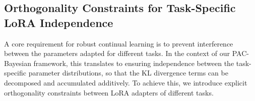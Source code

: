 \documentclass[letterpaper]{article} %
\begin{document}
\subsection{Orthogonality Constraints for Task-Specific LoRA Independence}

A core requirement for robust continual learning is to prevent interference between the parameters adapted for different tasks. In the context of our PAC-Bayesian framework, this translates to ensuring independence between the task-specific parameter distributions, so that the KL divergence terms can be decomposed and accumulated additively. To achieve this, we introduce explicit orthogonality constraints between LoRA adapters of different tasks.

\end{document}

